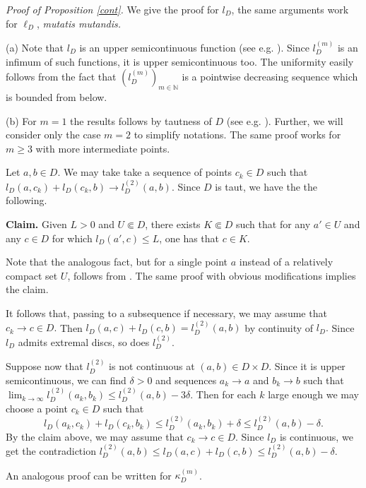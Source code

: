 \documentclass[a4paper,12pt]{amsart}
\def\N{\mathbb N}
\newenvironment{proof*}{\vskip 2mm\noindent {}}{\hfill $\Box$ \vskip 2mm}
\begin{document}
\begin{proof*}{\it Proof of Proposition \ref{cont}.}
We give the proof for $l_D$, the same arguments
work for $\ell_D$, {\it mutatis mutandis.}

(a) Note that $l_D$ is an upper semicontinuous function
(see e.g. \cite[Proposition 3.1.14]{JP}). Since $l_D^{(m)}$ is an infimum of such functions, it is
upper semicontinuous too. The uniformity easily follows from the fact that $(l_D^{(m)})_{m\in\N}$
is a pointwise decreasing sequence which is bounded from below.
\smallskip

(b) For $m=1$ the results follows by tautness of $D$ (see e.g. \cite[Propositions 3.2.7 and 3.2.9]{JP}).
Further, we will consider only the case $m=2$ to simplify notations. The same proof works for $m\ge 3$
with more intermediate points.

Let $a,b\in D.$ We may take take a sequence of points $c_k\in D$ such that
$l_D(a,c_k)+l_D(c_k,b)\to l_D^{(2)}(a,b).$ Since $D$ is taut, we have the the following.
\smallskip

{\bf Claim.} Given $L>0$ and $U\Subset D$, there exists $K\Subset D$ such that
for any $a'\in U$ and any $c\in D$ for which $l_D(a',c)\le L$, one has that $c\in K.$
\smallskip

Note that the analogous fact, but for a single point $a$ instead of
a relatively compact set $U$, follows from \cite[Proposition 3.2.1]{JP}.
The same proof with obvious modifications implies the claim.

It follows that, passing to a subsequence if necessary, we may assume that $c_k\to c\in D.$
Then $l_D(a,c)+l_D(c,b)=l_D^{(2)}(a,b)$ by continuity of $l_D.$ Since $l_D$
admits extremal discs, so does $l_D^{(2)}$.

Suppose now that $l_D^{(2)}$ is not continuous at $(a,b)\in D\times D.$ Since it is upper semicontinuous,
we can find $\delta>0$ and sequences $a_k \to a$ and $b_k \to b$ such that
$\lim_{k\to \infty}l_D^{(2)}(a_k,b_k) \le l_D^{(2)}(a,b) -3\delta$. Then for each $k$ large enough
we may choose a point $c_k\in D$ such that
$$l_D(a_k,c_k) +  l_D(c_k,b_k) \le  l_D^{(2)}(a_k,b_k) + \delta \le  l_D^{(2)}(a,b)- \delta.$$
By the claim above, we may assume that $c_k\to c\in D$. Since $l_D$ is continuous, we get the
contradiction $l_D^{(2)}(a,b) \le l_D(a,c)+l_D(c,b) \le l_D^{(2)}(a,b) -\delta.$

\smallskip
An analogous proof can be written for $\kappa^{(m)}_D$.
\end{proof*}

\smallskip
\end{document}
